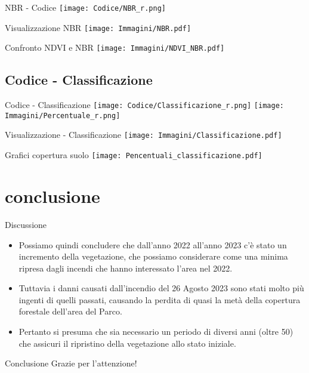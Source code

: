 \documentclass{beamer}
\begin{document}
\begin{frame}{NBR - Codice}
\texttt{[image: Codice/NBR\_r.png]}
\end{frame}

\begin{frame}{Visualizzazione NBR}
    \texttt{[image: Immagini/NBR.pdf]}
\end{frame}

\begin{frame}{Confronto NDVI e NBR}
    \texttt{[image: Immagini/NDVI\_NBR.pdf]}
\end{frame}
    
\subsection{Codice - Classificazione}
\begin{frame}{Codice - Classificazione}
\texttt{[image: Codice/Classificazione\_r.png]}
\texttt{[image: Immagini/Percentuale\_r.png]}
\centering  
\end{frame}

\begin{frame}{Visualizzazione - Classificazione}
\texttt{[image: Immagini/Classificazione.pdf]}
    \end{frame}

\begin{frame}{Grafici copertura suolo}
\texttt{[image: Pencentuali\_classificazione.pdf]}
\end{frame}

\section{conclusione}
\begin{frame}{Discussione}
    \begin{itemize} 
        \item Possiamo quindi concludere che dall'anno 2022 all'anno 2023 c'è stato un incremento della vegetazione, che possiamo considerare come una minima ripresa dagli incendi che hanno interessato l'area nel 2022.
        
        \item Tuttavia i danni causati dall'incendio del 26 Agosto 2023 sono stati molto più ingenti di quelli passati, causando la perdita di quasi la metà della copertura forestale dell'area del Parco.
        
        \item Pertanto si presuma che sia necessario un periodo di diversi anni (oltre 50) che assicuri il ripristino della vegetazione allo stato iniziale. 
    \end{itemize}
\end{frame}

\begin{frame}{Conclusione}
Grazie per l'attenzione!
\centering
    \end{frame}
\end{document}
